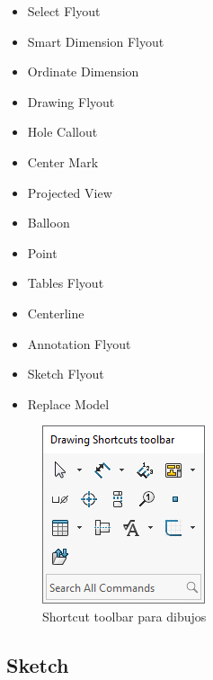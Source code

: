 \documentclass[12pt,letterpaper,final]{report}
\begin{document}
\begin{itemize}
	\item Select Flyout
	\item Smart Dimension Flyout
	\item Ordinate Dimension
	\item Drawing Flyout
	\item Hole Callout
	\item Center Mark
	\item Projected View
	\item Balloon
	\item Point
	\item Tables Flyout
	\item Centerline
	\item Annotation Flyout
	\item Sketch Flyout
	\item Replace Model

\end{itemize}

\begin{figure}[H]
	\centering
	\includegraphics[width=0.45\linewidth, height=0.45\textheight,keepaspectratio]{Imagenes/solidworks_shortcutbars_05}
	\caption{Shortcut toolbar para dibujos}
	\label{fig:solidworksshortcutbars05}
\end{figure}

\subsection{Sketch}
\end{document}
